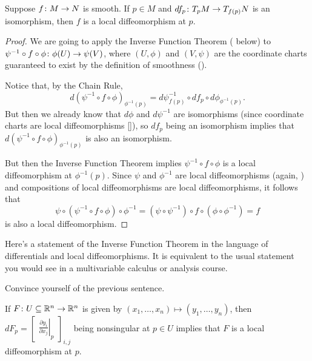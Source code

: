 \begin{proposition}\label{prop:local diffeomorphism}
	Suppose $f \colon\thinspace\! M \to N$ is smooth. If $p \in M$ and $df_p \colon\thinspace\! T_p M \to T_{f(p)}N$ is an isomorphism, then $f$ is a local diffeomorphism at $p$.
\end{proposition}

\begin{proof}
	We are going to apply the Inverse Function Theorem ( below) to $\psi^{-1} \circ f \circ \phi \colon\thinspace\! \phi(U) \to \psi(V)$, where $(U,\phi)$ and $(V, \psi)$ are the coordinate charts guaranteed to exist by the definition of smoothness ().
	
	Notice that, by the Chain Rule,
	\[
		d(\psi^{-1} \circ f \circ \phi)_{\phi^{-1}(p)} = d\psi^{-1}_{f(p)} \circ df_p \circ d\phi_{\phi^{-1}(p)}.
	\]
	But then we already know that $d\phi$ and $d\psi^{-1}$ are isomorphisms (since coordinate charts are local diffeomorphisms []), so $df_p$ being an isomorphism implies that $d(\psi^{-1} \circ f \circ \phi)_{\phi^{-1}(p)}$ is also an isomorphism.
	
	But then the Inverse Function Theorem implies $\psi^{-1} \circ f \circ \phi$ is a local diffeomorphism at $\phi^{-1}(p)$. Since $\psi$ and $\phi^{-1}$ are local diffeomorphisms (again, ) and compositions of local diffeomorphisms are local diffeomorphisms, it follows that
	\[
		\psi \circ (\psi^{-1} \circ f \circ \phi) \circ \phi^{-1} = (\psi \circ \psi^{-1}) \circ f \circ (\phi \circ \phi^{-1}) = f
	\]
	is also a local diffeomorphism.
\end{proof}

Here's a statement of the Inverse Function Theorem in the language of differentials and local diffeomorphisms. It is equivalent to the usual statement you would see in a multivariable calculus or analysis course.

\begin{exercise}
	Convince yourself of the previous sentence.
\end{exercise}

\begin{theorem}\label{thm:inverse function theorem}
	If $F \colon\thinspace\! U \subseteq \mathbb{R}^n \to \mathbb{R}^n$ is given by $(x_1, \dots , x_n) \mapsto (y_1, \dots , y_n)$, then $dF_p = \begin{bmatrix} \left.\frac{\partial y_i}{\partial x_j}\right|_p\end{bmatrix}_{i,j}$ being nonsingular at $p \in U$ implies that $F$ is a local diffeomorphism at $p$.
\end{theorem}

